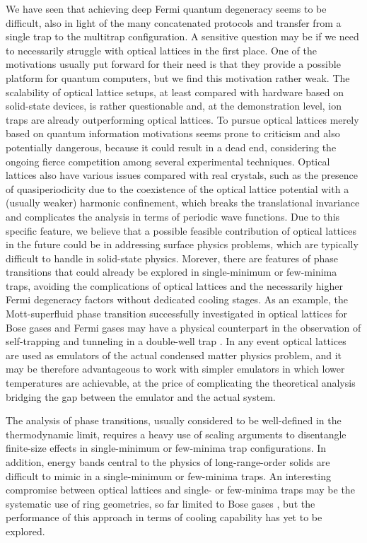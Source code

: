 \documentclass[pra,letterpaper,twocolumn,showpacs,superscriptaddress]{revtex4}
\begin{document}
We have seen that achieving deep Fermi quantum degeneracy seems to be difficult, also in light of the many concatenated protocols and 
transfer from a single trap to the multitrap configuration. A sensitive question may be if we need to necessarily 
struggle with optical lattices in the first place. One of the motivations usually put forward for their need is that they provide a possible platform 
for quantum computers, but we find this motivation rather weak.  The scalability of optical lattice setups, at least compared with hardware based on 
solid-state devices, is rather questionable and, at the demonstration level, ion traps are already outperforming optical lattices. 
To pursue optical lattices merely based on quantum information motivations seems prone to criticism and also potentially dangerous, because it 
could result in a dead end, considering the ongoing fierce competition among several experimental techniques. Optical lattices also have various 
issues compared with real crystals, such as the presence of quasiperiodicity due to the coexistence of the optical lattice potential with 
a (usually weaker) harmonic confinement, which breaks the translational invariance and complicates the analysis in terms of periodic 
wave functions. Due to this specific feature, we believe that a possible feasible contribution of optical lattices in the future could be 
in addressing surface physics problems, which are typically difficult to handle in solid-state physics. Morever, there are features of 
phase transitions that could already be explored in single-minimum or few-minima traps, avoiding the complications of optical lattices and 
the necessarily higher Fermi degeneracy factors without dedicated cooling stages. As an example, the Mott-superfluid phase transition 
successfully investigated in optical lattices for Bose gases \cite{Greiner2002} and Fermi gases \cite{Jordens2008,Schneider2008} 
may have a physical counterpart in the observation of self-trapping and tunneling in a double-well trap \cite{Albiez2005}. 
In any event optical lattices are used as emulators of the actual condensed matter physics problem, and it may be therefore advantageous 
to work with simpler emulators in which lower temperatures are achievable, at the price of complicating the theoretical analysis 
bridging the gap between the emulator and the actual system. 

The analysis of phase transitions, usually considered to be well-defined in the thermodynamic limit, requires a heavy use of scaling 
arguments to disentangle finite-size effects in single-minimum or few-minima trap configurations.  In addition, energy bands central to the physics 
of long-range-order solids are difficult to mimic in a single-minimum or few-minima traps. An interesting compromise between optical lattices 
and single- or few-minima traps may be the systematic use of ring geometries, so far limited to Bose gases \cite{Ramanathan2011,Moulder2012,Ryu2013,Edward2015}, but 
the performance of this approach in terms of cooling capability has yet to be explored. 
\end{document}
